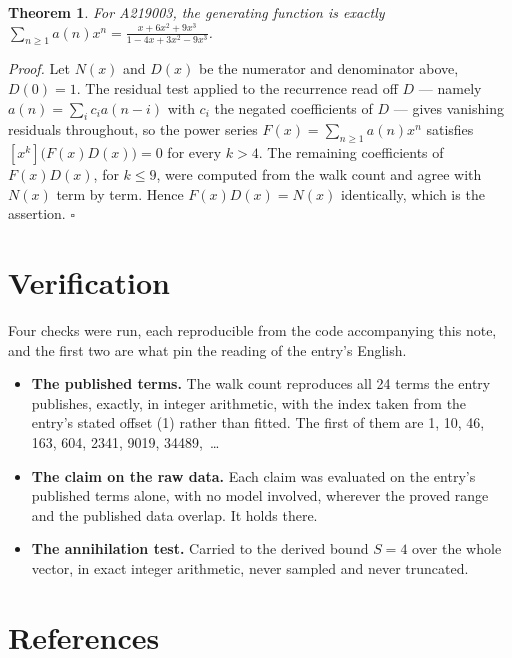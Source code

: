 \documentclass[11pt]{article}
\newtheorem{theorem}{Theorem}
\theoremstyle{definition}
\begin{document}
\begin{theorem} For A219003, the generating function is exactly $\sum_{n\ge 1} a(n)x^n = \frac{x + 6x^{2} + 9x^{3}}{1 - 4x + 3x^{2} - 9x^{3}}$.\end{theorem}

{\itshape Proof.} Let $N(x)$ and $D(x)$ be the numerator and denominator above, $D(0)=1$. The residual test applied to the recurrence read off $D$ --- namely $a(n) = \sum_i c_i a(n-i)$ with $c_i$ the negated coefficients of $D$ --- gives vanishing residuals throughout, so the power series $F(x)=\sum_{n\ge 1}a(n)x^n$ satisfies $[x^k]\bigl(F(x)D(x)\bigr) = 0$ for every $k > 4$. The remaining coefficients of $F(x)D(x)$, for $k \le 9$, were computed from the walk count and agree with $N(x)$ term by term. Hence $F(x)D(x) = N(x)$ identically, which is the assertion. $\square$

\section{Verification}

Four checks were run, each reproducible from the code accompanying this note, and the first two are what pin the reading of the entry's English.

\begin{itemize}

\item {\bfseries The published terms.} The walk count reproduces all 24 terms the entry publishes, exactly, in integer arithmetic, with the index taken from the entry's stated offset (1) rather than fitted. The first of them are 1, 10, 46, 163, 604, 2341, 9019, 34489,~\dots

\item {\bfseries The claim on the raw data.} Each claim was evaluated on the entry's published terms alone, with no model involved, wherever the proved range and the published data overlap. It holds there.

\item {\bfseries The annihilation test.} Carried to the derived bound $S = 4$ over the whole vector, in exact integer arithmetic, never sampled and never truncated.

\end{itemize}

\section{References}
\end{document}
